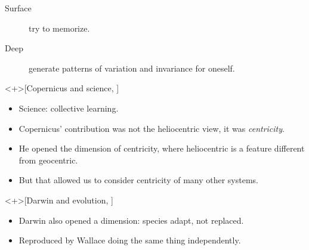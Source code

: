 \begin{frame}
  \begin{remark}
  \end{remark}

  \begin{example}
    \begin{description}
      \item[Surface] try to memorize.
      \item[Deep] generate patterns of variation and invariance for oneself.
    \end{description}
  \end{example}
\end{frame}

\begin{frame}
  \begin{example}<+>[Copernicus and science, 
    {\cite[pp.~155--156]{NecessaryConditionsOfLearning}}]
    \begin{itemize}
      \item Science: collective learning.
      \item Copernicus' contribution was not the heliocentric view, it was 
        \emph{centricity}.
      \item He opened the dimension of centricity, where heliocentric is a 
        feature different from geocentric.
      \item But that allowed us to consider centricity of many other systems.
    \end{itemize}
  \end{example}

  \begin{example}<+>[Darwin and evolution, 
    {\cite[pp.~157--160]{NecessaryConditionsOfLearning}}]
    \begin{itemize}
      \item Darwin also opened a dimension: species adapt, not replaced.
      \item Reproduced by Wallace doing the same thing independently.
    \end{itemize}
  \end{example}
\end{frame}

